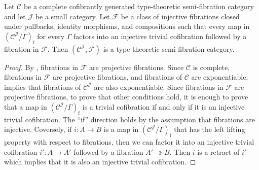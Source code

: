 \documentclass[reqno]{amsart}
\theoremstyle{definition}
\theoremstyle{remark}
\newcommand{\fs}[1]{\mathrm{#1}}
\newcommand{\scat}[1]{\mathcal{#1}}
\newcommand{\Fib}{\mathcal{F}}
\numberwithin{figure}{section}
\begin{document}
\begin{prop}[injective]
Let $\scat{C}$ be a complete cofibrantly generated type-theoretic semi-fibration category and let $\scat{J}$ be a small category.
Let $\Fib$ be a class of injective fibrations closed under pullbacks, identity morphisms, and compositions such that every map in $(\scat{C}^\scat{J}/\Gamma)_\fs{f}$ for every $\Gamma$ factors into an injective trivial cofibration followed by a fibration in $\Fib$.
Then $(\scat{C}^\scat{J},\Fib)$ is a type-theoretic semi-fibration category.
\end{prop}
\begin{proof}
By , fibrations in $\Fib$ are projective fibrations.
Since $\scat{C}$ is complete, fibrations in $\Fib$ are projective fibrations, and fibrations of $\scat{C}$ are exponentiable, \cite[Theorem~2.12]{comp-fact-tor} implies that fibrations of $\scat{C}^\scat{J}$ are also exponentiable.
Since fibrations in $\Fib$ are projective fibrations, to prove that other conditions hold, it is enough to prove that a map in $(\scat{C}^\scat{J}/\Gamma)_\fs{f}$ is a trivial cofibration if and only if it is an injective trivial cofibration.
The ``if'' direction holds by the assumption that fibrations are injective.
Coversely, if $i : A \to B$ is a map in $(\scat{C}^\scat{J}/\Gamma)_\fs{f}$ that has the left lifting property with respect to fibrations, then we can factor it into an injective trivial cofibration $i' : A \to A'$ followed by a fibration $A' \twoheadrightarrow B$.
Then $i$ is a retract of $i'$ which implies that it is also an injective trivial cofibration.
\end{proof}
\end{document}
